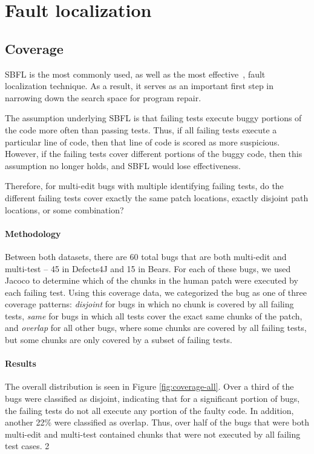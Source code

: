 \section{Fault localization}


\subsection{Coverage}


SBFL is the most commonly used, as well as the most 
effective~\cite{zou2019empirical}, fault localization technique. As a result, 
it serves as an important first step in narrowing down the search 
space for program repair.

The assumption underlying SBFL is that failing tests execute buggy portions of 
the code more often than passing tests. Thus, if all failing tests execute a 
particular line of code, then that line of code is scored as more suspicious. 
However, if the failing tests cover different portions of the buggy code, then 
this assumption no longer holds, and SBFL would lose effectiveness.

Therefore, for multi-edit bugs with multiple identifying failing tests, do the 
different failing tests cover exactly the same patch locations, exactly 
disjoint path locations, or some combination?

\paragraph{Methodology}

Between both datasets, there are 60 total bugs that are both multi-edit and 
multi-test -- 45 in Defects4J and 15 in Bears. For each of these bugs, we used 
Jacoco to determine which of the chunks in the human patch were executed by each failing test. Using 
this coverage data, we categorized the bug as one of 
three coverage patterns: \textit{disjoint} for bugs in which no chunk is covered by all failing tests, 
\textit{same} for bugs in which all 
tests cover the exact same chunks of the patch, and \textit{overlap} for all 
other bugs, where some chunks are covered by all failing tests, but some chunks are only covered by a 
subset of failing tests.

\paragraph{Results}
The overall distribution is seen in Figure \ref{fig:coverage-all}. Over a third 
of the bugs were classified as disjoint, indicating that for a significant 
portion of bugs, the failing tests do not all execute any portion of the faulty 
code. In addition, another 22\% were classified as overlap. Thus, over half of 
the bugs that were both multi-edit and multi-test contained chunks that were 
not executed by all failing test cases.
2

